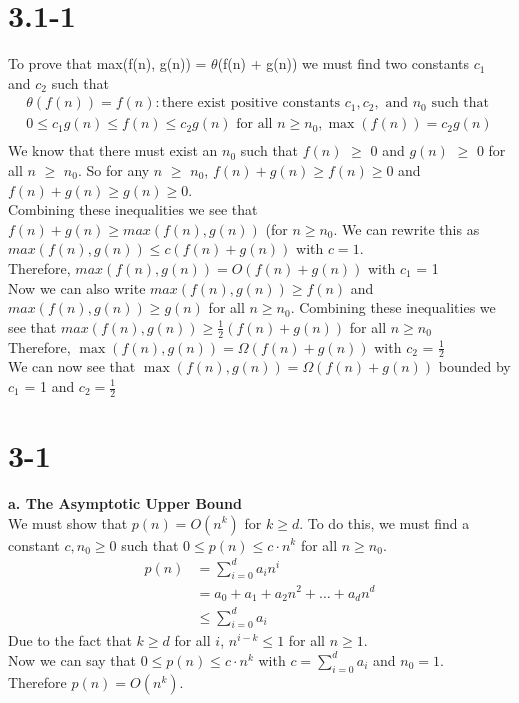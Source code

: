 \documentclass{article}
\begin{document}
{\section{3.1-1}
To prove that max(f(n), g(n)) = $\theta$(f(n) + g(n)) we must find two constants $c_{1}$ and $c_{2}$ such that \\
\begin{align*}
  \theta(f(n)) = f(n) : \textrm{there exist positive constants } c_1, c_2, \text{ and } n_0
  \text{ such that } \\
  0 \leq c_1g(n) \leq f(n) \leq c_2g(n) \textrm{ for all } n \geq n_0, \max(f(n)) = c_2g(n) \\
\end{align*}
We know that there must exist an $n_{0}$ such that $f(n)$ $\geq$ 0 and $g(n)$ $\geq$ 0 for all
$n$ $\geq$ $n_{0}$. So for any $n$ $\geq$ $n_{0}$, $f(n) + g(n) \geq f(n) \geq 0$ and $f(n) +
g(n) \geq g(n) \geq 0$. \\
Combining these inequalities we see that $f(n) + g(n) \geq max(f(n),g(n))$ (for $n \geq n_{0}$.
We can rewrite this as $max(f(n),g(n)) \leq c(f(n) + g(n))$ with $c = 1$. \\
Therefore, $max(f(n),g(n)) = O(f(n) + g(n))$ with $c_{1}$ = 1\\

\noindent
Now we can also write $max(f(n),g(n)) \geq f(n)$ and $max(f(n),g(n)) \geq g(n)$
for all $n \geq n_{0}$. Combining these inequalities we see that
$max(f(n),g(n)) \geq \frac{1}{2}(f(n) + g(n))$ for all $n \geq n_{0}$ \\
Therefore, $\max(f(n),g(n)) = \Omega(f(n) + g(n))$ with $c_{2}$ = $\frac{1}{2}$ \\

\noindent
We can now see that $\max(f(n),g(n)) = \Omega(f(n) + g(n))$ bounded by $c_{1}$ = 1 and $c_{2} = \frac{1}{2}$


\section{3-1}
\textbf{a. The Asymptotic Upper Bound} \\
We must show that $p(n) = O(n^k)$ for $k \geq d$. To do this, we must find a constant $c, n_{0} \geq 0$
such that $0 \leq p(n) \leq c \cdot n^k$ for all $n \geq n_{0}$. \\
\begin{align*}
  p(n) &= \sum_{i=0}^{d} a_{i}n^i \\
       &= a_{0} + a_{1} + a_2n^2 + \dots + a_dn^d \\
       &\leq \sum_{i=0}^{d} a_i
\end{align*}
Due to the fact that $k \geq d$ for all $i$, $n^{i-k} \leq 1$ for all $n \geq 1$. \\
Now we can say that $0 \leq p(n) \leq c \cdot n^k$ with $c = \sum_{i=0}^{d} a_i$ and $n_0 = 1$. \\
Therefore $p(n) = O(n^k)$.
\\

}
\end{document}
